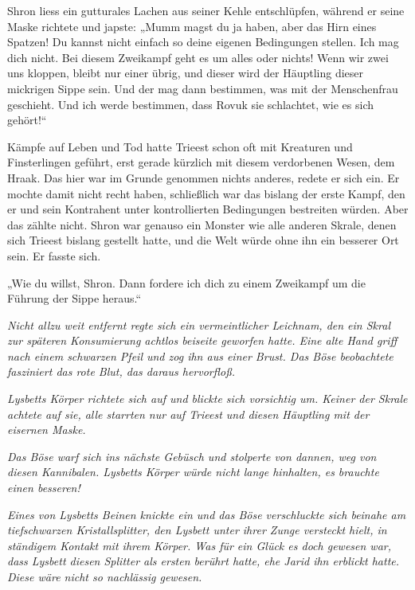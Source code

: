 Shron liess ein gutturales Lachen aus seiner Kehle entschlüpfen, während er seine Maske richtete und japste: „Mumm magst du ja haben, aber das Hirn eines Spatzen! Du kannst nicht einfach so deine eigenen Bedingungen stellen. Ich mag dich nicht. Bei diesem Zweikampf geht es um alles oder nichts! Wenn wir zwei uns kloppen, bleibt nur einer übrig, und dieser wird der Häuptling dieser mickrigen Sippe sein. Und der mag dann bestimmen, was mit der Menschenfrau geschieht. Und ich werde bestimmen, dass Rovuk sie schlachtet, wie es sich gehört!“

Kämpfe auf Leben und Tod hatte Trieest schon oft mit Kreaturen und Finsterlingen geführt, erst gerade kürzlich mit diesem verdorbenen Wesen, dem Hraak. Das hier war im Grunde genommen nichts anderes, redete er sich ein. Er mochte damit nicht recht haben, schließlich war das bislang der erste Kampf, den er und sein Kontrahent unter kontrollierten Bedingungen bestreiten würden. Aber das zählte nicht. Shron war genauso ein Monster wie alle anderen Skrale, denen sich Trieest bislang gestellt hatte, und die Welt würde ohne ihn ein besserer Ort sein. Er fasste sich.

„Wie du willst, Shron. Dann fordere ich dich zu einem Zweikampf um die Führung der Sippe heraus.“\bigskip







\textit{Nicht allzu weit entfernt regte sich ein vermeintlicher Leichnam, den ein Skral zur späteren Konsumierung achtlos beiseite geworfen hatte. Eine alte Hand griff nach einem schwarzen Pfeil und zog ihn aus einer Brust. Das Böse beobachtete fasziniert das rote Blut, das daraus hervorfloß.}

\textit{Lysbetts Körper richtete sich auf und blickte sich vorsichtig um. Keiner der Skrale achtete auf sie, alle starrten nur auf Trieest und diesen Häuptling mit der eisernen Maske.}

\textit{Das Böse warf sich ins nächste Gebüsch und stolperte von dannen, weg von diesen Kannibalen. Lysbetts Körper würde nicht lange hinhalten, es brauchte einen besseren!}

\textit{Eines von Lysbetts Beinen knickte ein und das Böse verschluckte sich beinahe am tiefschwarzen Kristallsplitter, den Lysbett unter ihrer Zunge versteckt hielt, in ständigem Kontakt mit ihrem Körper. Was für ein Glück es doch gewesen war, dass Lysbett diesen Splitter als ersten berührt hatte, ehe Jarid ihn erblickt hatte. Diese wäre nicht so nachlässig gewesen.}


